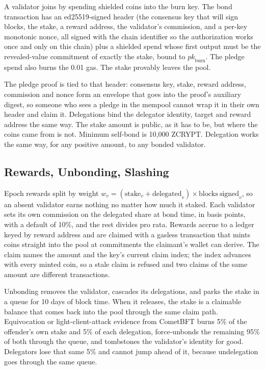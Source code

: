 \documentclass[twocolumn,10pt]{article}
\begin{document}
A validator joins by spending shielded coins into the burn key. The bond transaction has an ed25519-signed header (the consensus key that will sign blocks, the stake, a reward address, the validator's commission, and a per-key monotonic nonce, all signed with the chain identifier so the authorization works once and only on this chain) plus a shielded spend whose first output must be the revealed-value commitment of exactly the stake, bound to $\mathit{pk}_{\mathrm{burn}}$. The pledge spend also burns the 0.01 gas. The stake provably leaves the pool.

The pledge proof is tied to that header: consensus key, stake, reward address, commission and nonce form an envelope that goes into the proof's auxiliary digest, so someone who sees a pledge in the mempool cannot wrap it in their own header and claim it. Delegations bind the delegator identity, target and reward address the same way. The stake amount is public, as it has to be, but where the coins came from is not. Minimum self-bond is 10{,}000 ZCRYPT. Delegation works the same way, for any positive amount, to any bonded validator.

\subsection{Rewards, Unbonding, Slashing}

Epoch rewards split by weight $w_v = (\mathrm{stake}_v + \mathrm{delegated}_v)\times \mathrm{blocks\ signed}_v$, so an absent validator earns nothing no matter how much it staked. Each validator sets its own commission on the delegated share at bond time, in basis points, with a default of 10\%, and the rest divides pro rata. Rewards accrue to a ledger keyed by reward address and are claimed with a gasless transaction that mints coins straight into the pool at commitments the claimant's wallet can derive. The claim names the amount and the key's current claim index; the index advances with every minted coin, so a stale claim is refused and two claims of the same amount are different transactions.

Unbonding removes the validator, cascades its delegations, and parks the stake in a queue for 10 days of block time. When it releases, the stake is a claimable balance that comes back into the pool through the same claim path. Equivocation or light-client-attack evidence from CometBFT burns 5\% of the offender's own stake and 5\% of each delegation, force-unbonds the remaining 95\% of both through the queue, and tombstones the validator's identity for good. Delegators lose that same 5\% and cannot jump ahead of it, because undelegation goes through the same queue.
\end{document}
